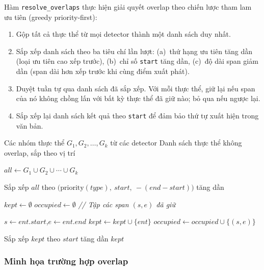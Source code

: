 Hàm \texttt{resolve\_overlaps} thực hiện giải quyết overlap theo chiến lược
tham lam ưu tiên (greedy priority-first):

\begin{enumerate}[nosep]
    \item Gộp tất cả thực thể từ mọi detector thành một danh sách duy nhất.
    \item Sắp xếp danh sách theo ba tiêu chí lần lượt: (a)~thứ hạng ưu tiên
          tăng dần (loại ưu tiên cao xếp trước), (b)~chỉ số \texttt{start}
          tăng dần, (c)~độ dài span giảm dần (span dài hơn xếp trước khi cùng
          điểm xuất phát).
    \item Duyệt tuần tự qua danh sách đã sắp xếp. Với mỗi thực thể, giữ lại
          nếu span của nó không chồng lấn với bất kỳ thực thể đã giữ nào;
          bỏ qua nếu ngược lại.
    \item Sắp xếp lại danh sách kết quả theo \texttt{start} để đảm bảo thứ tự
          xuất hiện trong văn bản.
\end{enumerate}

\begin{algorithm}[H]
\caption{Thuật toán hợp nhất và giải quyết overlap (Greedy Priority-First)}
\label{alg:merger}
\begin{algorithmic}[1]
\Require Các nhóm thực thể $G_1, G_2, \ldots, G_k$ từ các detector
\Ensure Danh sách thực thể không overlap, sắp theo vị trí

\State $all \leftarrow G_1 \cup G_2 \cup \cdots \cup G_k$

\State Sắp xếp $all$ theo $\bigl(\text{priority}(type),\ start,\ -(end - start)\bigr)$ tăng dần

\State $kept \leftarrow \emptyset$
\State $occupied \leftarrow \emptyset$ \quad \textit{// Tập các span $(s, e)$ đã giữ}

    \State $s \leftarrow ent.start$,\quad $e \leftarrow ent.end$
        \State $kept \leftarrow kept \cup \{ent\}$
        \State $occupied \leftarrow occupied \cup \{(s, e)\}$
    \EndIf
\EndFor

\State Sắp xếp $kept$ theo $start$ tăng dần
\State \Return $kept$
\end{algorithmic}
\end{algorithm}

\subsubsection{Minh họa trường hợp overlap}


